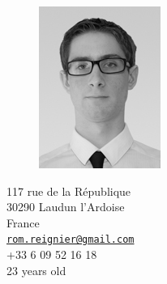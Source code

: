 \documentclass[a4paper,11pt,final]{memoir}
\begin{document}
\begin{figure}
	\hfill
	\includegraphics[width=0.5\columnwidth]{../IMG_7936-Modifier_cv}
	\vspace{-0.5cm}
\end{figure}

\begin{flushright}\small
	117 rue de la République\\
	30290 Laudun l'Ardoise\\
	France\\
	{\href{mailto:rom.reignier@gmail.com}{\nolinkurl{rom.reignier@gmail.com}}}\\
	+33 6 09 52 16 18\\
	23 years old
\end{flushright}%
\end{document}

